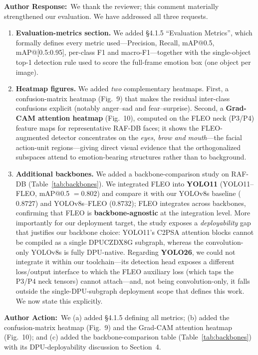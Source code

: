 \documentclass[11pt]{article}
\newcommand{\response}{\smallskip\par\noindent\textbf{\color{steel}Author Response:}\ }
\newcommand{\action}{\smallskip\par\noindent\textbf{\color{steel}Author Action:}\ }
\begin{document}
\response We thank the reviewer; this comment materially strengthened our evaluation. We have
addressed all three requests.
\begin{enumerate}[label=(\roman*),leftmargin=1.7em,itemsep=2pt,topsep=3pt]
  \item \textbf{Evaluation-metrics section.} We added \S4.1.5 ``Evaluation Metrics'', which
  formally defines every metric used---Precision, Recall, mAP@0.5, mAP@[0.5:0.95], per-class
  F1 and macro-F1---together with the single-object top-1 detection rule used to score the
  full-frame emotion box (one object per image).
  \item \textbf{Heatmap figures.} We added \emph{two} complementary heatmaps. First, a
  confusion-matrix heatmap (Fig.~9) that makes the residual inter-class confusions explicit
  (notably anger--sad and fear--surprise). Second, a \textbf{Grad-CAM attention heatmap}
  (Fig.~10), computed on the FLEO neck (P3/P4) feature maps for representative RAF-DB faces;
  it shows the FLEO-augmented detector concentrates on the \emph{eyes, brow and mouth}---the
  facial action-unit regions---giving direct visual evidence that the orthogonalized subspaces
  attend to emotion-bearing structures rather than to background.
  \item \textbf{Additional backbones.} We added a backbone-comparison study on RAF-DB
  (Table~\ref{tab:backbones}). We integrated FLEO into \textbf{YOLO11} (YOLO11--FLEO,
  mAP@0.5 $=0.802$) and compare it with our YOLOv8s baseline ($0.8727$) and YOLOv8s--FLEO
  ($0.8732$); FLEO integrates across backbones, confirming that FLEO is
  \textbf{backbone-agnostic} at the integration level. More importantly for our deployment
  target, the study exposes a \emph{deployability} gap that justifies our backbone choice:
  YOLO11's C2PSA attention blocks cannot be compiled as a single DPUCZDX8G subgraph, whereas the
  convolution-only YOLOv8s is fully DPU-native. Regarding \textbf{YOLO26}, we could not integrate
  it within our toolchain---its detection head exposes a different loss/output interface to which
  the FLEO auxiliary loss (which taps the P3/P4 neck tensors) cannot attach---and, not being
  convolution-only, it falls outside the single-DPU-subgraph deployment scope that defines this
  work. We now state this explicitly.
\end{enumerate}

\action We (a) added \S4.1.5 defining all metrics; (b) added the confusion-matrix heatmap
(Fig.~9) and the Grad-CAM attention heatmap (Fig.~10); and (c) added the backbone-comparison
table (Table~\ref{tab:backbones}) with its DPU-deployability discussion to Section~4.
\end{document}

